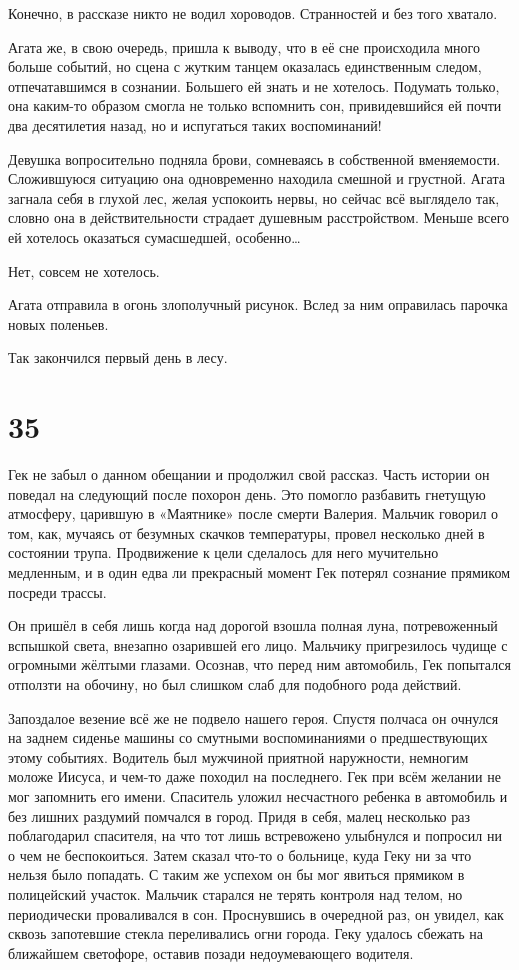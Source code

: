 \documentclass[
  a5paperpaper,
  DIV=11,
  numbers=noendperiod]{scrreprt}
\begin{document}
Конечно, в рассказе никто не водил хороводов. Странностей и без того
хватало.

Агата же, в свою очередь, пришла к выводу, что в её сне происходила
много больше событий, но сцена с жутким танцем оказалась единственным
следом, отпечатавшимся в сознании. Большего ей знать и не хотелось.
Подумать только, она каким-то образом смогла не только вспомнить сон,
привидевшийся ей почти два десятилетия назад, но и испугаться таких
воспоминаний!

Девушка вопросительно подняла брови, сомневаясь в собственной
вменяемости. Сложившуюся ситуацию она одновременно находила смешной и
грустной. Агата загнала себя в глухой лес, желая успокоить нервы, но
сейчас всё выглядело так, словно она в действительности страдает
душевным расстройством. Меньше всего ей хотелось оказаться сумасшедшей,
особенно\ldots{}

Нет, совсем не хотелось.

Агата отправила в огонь злополучный рисунок. Вслед за ним оправилась
парочка новых поленьев.

Так закончился первый день в лесу.

\section*{35}\label{35}


Гек не забыл о данном обещании и продолжил свой рассказ. Часть истории
он поведал на следующий после похорон день. Это помогло разбавить
гнетущую атмосферу, царившую в «Маятнике» после смерти Валерия. Мальчик
говорил о том, как, мучаясь от безумных скачков температуры, провел
несколько дней в состоянии трупа. Продвижение к цели сделалось для него
мучительно медленным, и в один едва ли прекрасный момент Гек потерял
сознание прямиком посреди трассы.

Он пришёл в себя лишь когда над дорогой взошла полная луна,
потревоженный вспышкой света, внезапно озарившей его лицо. Мальчику
пригрезилось чудище с огромными жёлтыми глазами. Осознав, что перед ним
автомобиль, Гек попытался отползти на обочину, но был слишком слаб для
подобного рода действий.

Запоздалое везение всё же не подвело нашего героя. Спустя полчаса он
очнулся на заднем сиденье машины со смутными воспоминаниями о
предшествующих этому событиях. Водитель был мужчиной приятной
наружности, немногим моложе Иисуса, и чем-то даже походил на последнего.
Гек при всём желании не мог запомнить его имени. Спаситель уложил
несчастного ребенка в автомобиль и без лишних раздумий помчался в город.
Придя в себя, малец несколько раз поблагодарил спасителя, на что тот
лишь встревожено улыбнулся и попросил ни о чем не беспокоиться. Затем
сказал что-то о больнице, куда Геку ни за что нельзя было попадать. С
таким же успехом он бы мог явиться прямиком в полицейский участок.
Мальчик старался не терять контроля над телом, но периодически
проваливался в сон. Проснувшись в очередной раз, он увидел, как сквозь
запотевшие стекла переливались огни города. Геку удалось сбежать на
ближайшем светофоре, оставив позади недоумевающего водителя.
\end{document}
